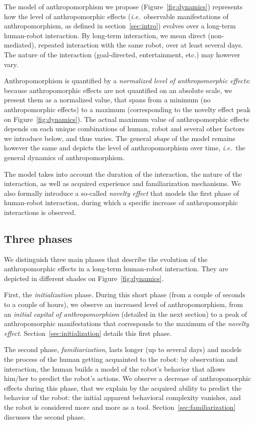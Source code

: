\documentclass[lettersize, apacite, twoside, HRI]{apa_HRI}
\newcommand{\ie}{{\textit{i.e.~}}}
\begin{document}
The model of anthropomorphism we propose (Figure~\ref{fig:dynamics}) represents
how the level of anthropomorphic effects (\ie observable manifestations of
anthropomorphism, as defined in section~\ref{sec:intro}) evolves over a
long-term human-robot interaction. By long-term interaction, we mean direct
(non-mediated), repeated interaction with the same robot, over at least several
days. The nature of the interaction (goal-directed, entertainment, etc.) may
however vary.

Anthropomorphism is quantified by a \emph{normalized level of anthropomorphic
effects}: because anthropomorphic effects are not quantified on an absolute
scale, we present them as a normalized value, that spans from a minimum (no
anthropomorphic effects) to a maximum (corresponding to the novelty effect peak
on Figure~\ref{fig:dynamics}). The actual maximum value of anthropomorphic
effects depends on each unique combinations of human, robot and several other
factors we introduce below, and thus varies. The general \emph{shape} of the
model remains however the same and depicts the level of anthropomorphism over
time, \ie the general dynamics of anthropomorphism.

The model takes into account the duration of the interaction, the nature of the
interaction, as well as acquired experience and familiarization mechanisms. We
also formally introduce a so-called \emph{novelty effect} that
models the first phase of human-robot interaction, during which a specific
increase of anthropomorphic interactions is observed.

\subsection{Three phases}
\label{sec:phases}

We distinguish three main phases that describe the evolution of the
anthropomorphic effects in a long-term human-robot interaction. They are
depicted in different shades on Figure~\ref{fig:dynamics}.

First, the \emph{initialization} phase. During this short phase (from a couple
of seconds to a couple of hours), we observe an increased level of
anthropomorphism, from an \emph{initial capital of anthropomorphism}
(detailed in the next section) to a peak of anthropomorphic manifestations
that corresponds to the maximum of the \emph{novelty effect}.
Section~\ref{sec:initialization} details this first phase.

The second phase, \emph{familiarization}, lasts longer (up to several days) and
models the process of the human getting acquainted to the robot: by observation
and interaction, the human builds a model of the robot's behavior that allows
him/her to predict the robot's actions. We observe a decrease of
anthropomorphic effects during this phase, that we explain by the acquired
ability to predict the behavior of the robot: the initial apparent behavioral
complexity vanishes, and the robot is considered more and more as a tool.
Section~\ref{sec:familiarization} discusses the second phase.
\end{document}
